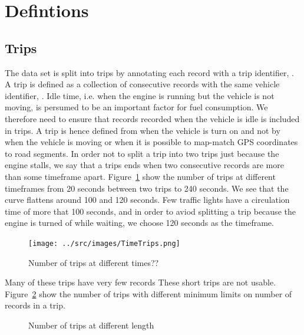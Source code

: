 \section{Defintions}
\subsection{Trips}
The data set is split into trips by annotating each record with a trip identifier, \tid.
A trip is defined as a collection of consecutive records with the same vehicle identifier, \vid.
Idle time, i.e. when the engine is running but the vehicle is not moving, is persumed to be an important factor for fuel consumption. 
We therefore need to ensure that records recorded when the vehicle is idle is included in trips. 
A trip is hence defined from when the vehicle is turn on and not by when the vehicle is moving or when it is possible to map-match GPS coordinates to road segments.
In order not to split a trip into two trips just because the engine stalls, we say that a trips ends when two consecutive records are more than some timeframe apart.
Figure~\ref{fig:TimeTrips} show the number of trips at different timeframes from 20 seconds between two trips to 240 seconds.
We see that the curve flattens around 100 and 120 seconds. 
Few traffic lights have a circulation time of more that 100 seconds, and in order to aviod splitting a trip because the engine is turned of while waiting, we choose 120 seconds as the timeframe. 
\begin{figure}[htb]
\centering
\texttt{[image: ../src/images/TimeTrips.png]}
\caption{Number of trips at different times??}
\label{fig:TimeTrips}
\end{figure}

Many of these trips have very few records %
These short trips are not usable.
Figure~\ref{fig:LengthTrips} show the number of trips with different minimum limits on number of records in a trip.
\begin{figure}[htb]
\centering
\caption{Number of trips at different length}
\label{fig:LengthTrips}
\end{figure}


